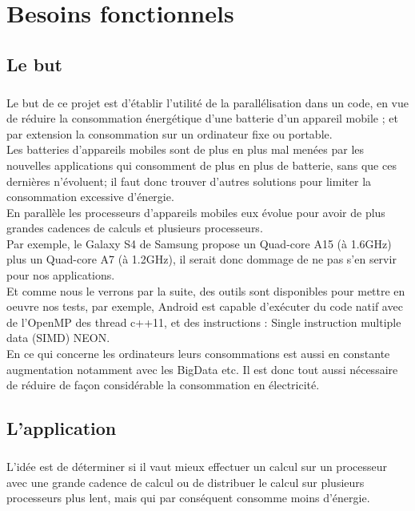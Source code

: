 \chapter{Besoins fonctionnels}

\section{Le but}
\paragraph{}
	Le but de ce projet est d'établir l'utilité de la parallélisation dans un code, en vue de réduire la consommation énergétique d'une batterie d'un appareil mobile ; et par extension la consommation sur un ordinateur fixe ou portable. \\

	Les batteries d'appareils mobiles sont de plus en plus mal menées par les nouvelles applications qui consomment de plus en plus de batterie, sans que ces dernières n'évoluent; il faut donc trouver d'autres solutions pour limiter la consommation excessive d'énergie.\\

	En parallèle les processeurs d'appareils mobiles eux évolue pour avoir de plus grandes cadences de calculs et plusieurs processeurs.\\

	Par exemple, le Galaxy S4 de Samsung propose un Quad-core A15 (à 1.6GHz) plus un Quad-core A7 (à 1.2GHz), il serait donc dommage de ne pas s'en servir pour nos applications.\\

	Et comme nous le verrons par la suite, des outils sont disponibles pour mettre en oeuvre nos tests, par exemple, Android est capable d'exécuter du code natif avec de l'OpenMP des thread c++11, et des instructions : Single instruction multiple data (SIMD) NEON. \\

	En ce qui concerne les ordinateurs leurs consommations est aussi en constante augmentation notamment avec les BigData etc. Il est donc tout aussi nécessaire de réduire de façon considérable la consommation en électricité.

\section{L'application}
\paragraph{}
	L'idée est de déterminer si il vaut mieux effectuer un calcul sur un processeur avec une grande cadence de calcul ou de distribuer le calcul sur plusieurs processeurs plus lent, mais qui par conséquent consomme moins d'énergie. \\

